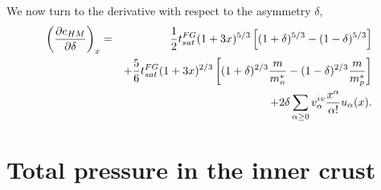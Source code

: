 %
We now turn to the derivative with respect to the asymmetry $\delta$,
%
\begin{eqnarray}
  \left(\frac{\partial e_{HM}}{\partial \delta}\right)_x &=&
  \frac{1}{2}t_{sat}^{FG}(1+3x)^{5/3}\left[(1+\delta)^{5/3} 
  - (1-\delta)^{5/3}\right]\notag\\
                                                         &&+ 
  \frac{5}{6}t_{sat}^{FG}(1+3x)^{2/3}\left[(1+\delta)^{2/3}\frac{m}{m_n^*} -
  (1-\delta)^{2/3}\frac{m}{m_p^*}\right]\notag\\
                                                         &&+
  2\delta \sum_{\alpha \geq 0}v_\alpha^{iv}\frac{x^\alpha}{\alpha!}u_\alpha(x).
\end{eqnarray}
%

\chapter{Total pressure in the inner crust}\label{appendix:presic}

